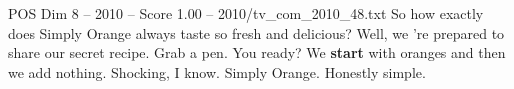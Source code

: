 \begin{textsample}{POS Dim 8 – 2010 – Score 1.00 – 2010/tv\_com\_2010\_48.txt}  \label{ex:f8_pos_056}
So how exactly does Simply Orange always taste so fresh and delicious?
Well, we 're prepared to share our secret recipe.
Grab a pen.
You ready?
We \textbf{start} with oranges and then we add nothing.
Shocking, I know.
Simply Orange.
Honestly simple.

\end{textsample}

